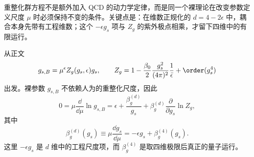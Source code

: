 \begin{derivation}
重整化群方程不是额外加入 QCD 的动力学定律，而是同一个裸理论在改变参数定义尺度 \(\mu\) 时必须保持不变的条件。关键点是：在维数正规化的 \(d=4-2\epsilon\) 中，耦合本身先带有工程维数；这个 \(-\epsilon g_s\) 项与 \(Z_g\) 的紫外极点相乘，才留下四维中的有限运行。

从正文
\begin{equation*}
g_{s,B}=\mu^\epsilon Z_g(g_s,\epsilon)g_s,
\qquad
Z_g
=1-\frac{\beta_0}{2}
\frac{g_s^2}{(4\pi)^2}
\frac1{\bar\epsilon}
+\order(g_s^4)
\end{equation*}
出发。裸参数 \(g_{s,B}\) 不依赖人为的重整化尺度，因此
\begin{equation*}
0=\mu\frac{\dd}{\dd\mu}\ln g_{s,B}
=\epsilon
+\frac{\beta_g^{(d)}}{g_s}
+\beta_g^{(d)}\frac{\partial}{\partial g_s}\ln Z_g,
\end{equation*}
其中
\begin{equation*}
\beta_g^{(d)}(g_s)
\equiv\mu\frac{\dd g_s}{\dd\mu}
=-\epsilon g_s+\beta_g^{(4)}(g_s).
\end{equation*}
这里 \(-\epsilon g_s\) 是 \(d\) 维中的工程尺度项，而 \(\beta_g^{(4)}\) 是取四维极限后真正的量子运行。


\end{derivation}
